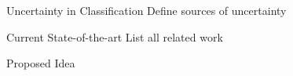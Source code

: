 \begin{frame}{Uncertainty in Classification}
    Define sources of uncertainty
\end{frame}

\begin{frame}{Current State-of-the-art}
    List all related work
\end{frame}

\begin{frame}{Proposed Idea}
    
\end{frame}

